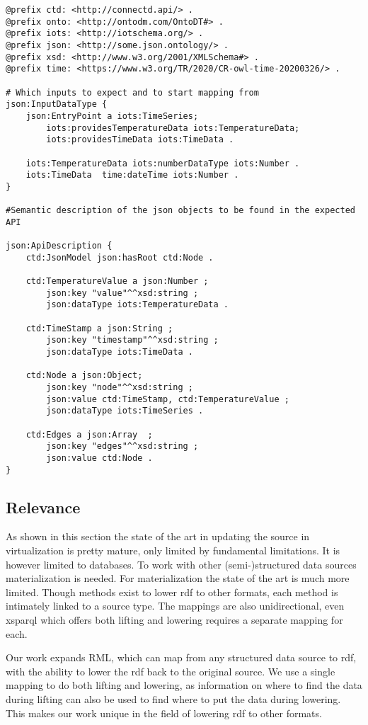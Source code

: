 \begin{lstlisting}[caption={Example of a POSER mapping}, label={lst:poser_mapping}, captionpos=b, basicstyle=\small]
@prefix ctd: <http://connectd.api/> .
@prefix onto: <http://ontodm.com/OntoDT#> .
@prefix iots: <http://iotschema.org/> .
@prefix json: <http://some.json.ontology/> .
@prefix xsd: <http://www.w3.org/2001/XMLSchema#> .
@prefix time: <https://www.w3.org/TR/2020/CR-owl-time-20200326/> .

# Which inputs to expect and to start mapping from
json:InputDataType {
    json:EntryPoint a iots:TimeSeries;
        iots:providesTemperatureData iots:TemperatureData;
        iots:providesTimeData iots:TimeData .

    iots:TemperatureData iots:numberDataType iots:Number .
    iots:TimeData  time:dateTime iots:Number .
}

#Semantic description of the json objects to be found in the expected API

json:ApiDescription {
    ctd:JsonModel json:hasRoot ctd:Node .

    ctd:TemperatureValue a json:Number ;
        json:key "value"^^xsd:string ;
        json:dataType iots:TemperatureData .

    ctd:TimeStamp a json:String ;
        json:key "timestamp"^^xsd:string ;
        json:dataType iots:TimeData .

    ctd:Node a json:Object;
        json:key "node"^^xsd:string ;
        json:value ctd:TimeStamp, ctd:TemperatureValue ;
        json:dataType iots:TimeSeries .

    ctd:Edges a json:Array	;
        json:key "edges"^^xsd:string ;
        json:value ctd:Node .
}
\end{lstlisting}

\subsection{Relevance}
As shown in this section the state of the art in updating the source in virtualization is pretty mature, only limited by fundamental limitations. It is however limited to databases. To work with other (semi-)structured data sources materialization is needed. For materialization the state of the art is much more limited. Though methods exist to lower \acrshort{rdf} to other formats, each method is intimately linked to a source type. The mappings are also unidirectional, even \acrshort{xsparql} which offers both lifting and lowering requires a separate mapping for each. 

Our work expands RML, which can map from any structured data source to \acrshort{rdf}, with the ability to lower the \acrshort{rdf} back to the original source. We use a single mapping to do both lifting and lowering, as information on where to find the data during lifting can also be used to find where to put the data during lowering. This makes our work unique in the field of lowering \acrshort{rdf} to other formats.